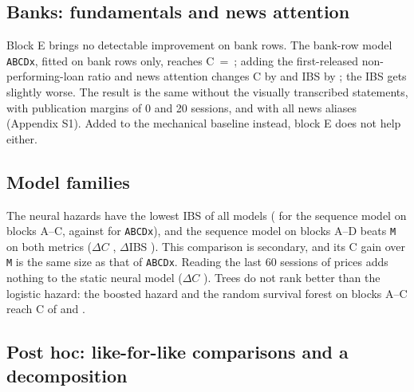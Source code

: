 \begin{table}[!htbp]
\centering
\caption{Trading test, test years 2017--2026, long-only, equal-weighted across the day's
universe, executed at the next open with T+2 settlement and price limits. Return: annualised; the
Sharpe ratio uses a zero risk-free rate. Columns 5--6 vary the round-trip cost (main: 0.40\%);
column 7 executes at the close of the session after the signal; column 8 forbids trades on days
whose price limit cannot be computed; column 9 assumes that a sell at a close on the floor never
fills (not computed for the mechanical exit).}\label{tab:trading}
\footnotesize
\setlength{\tabcolsep}{4pt}
\end{table}

\subsection{Banks: fundamentals and news attention}\label{sec:banks}

Block E brings no detectable improvement on bank rows. The bank-row model \texttt{ABCDx}, fitted on
bank rows only, reaches C~=~\BECBankABCDx; adding the
first-released non-performing-loan ratio and news attention changes C by
\PrimDCBankABCDxEBankABCDx{} and IBS by \PrimDIBSBankABCDxEBankABCDx; the IBS gets slightly worse.
The result is the same without the visually transcribed statements, with publication margins of 0
and 20 sessions, and with all news aliases (Appendix S1). Added to the
mechanical baseline instead, block E does not help either.

\subsection{Model families}\label{sec:families}

The neural hazards have the lowest IBS of all models (\IBSNnSeqABC{} for the sequence model on
blocks A--C, against \IBSABCDx{} for \texttt{ABCDx}), and the sequence model on blocks A--D beats
\texttt{M} on both metrics ($\Delta C$ \DCNnSeqABCDM, $\Delta$IBS \DIBSNnSeqABCDM). This comparison
is secondary, and its C gain over \texttt{M} is the same size as that of \texttt{ABCDx}. Reading
the last 60 sessions of prices adds nothing to the static neural model ($\Delta C$
\DCNnSeqABCDNnStaticABCD). Trees do not rank better than the logistic hazard: the boosted hazard and
the random survival forest on blocks A--C reach C of \CGbmABC{} and \CRsfABC.

\subsection{Post hoc: like-for-like comparisons and a decomposition}\label{sec:posthoc}

